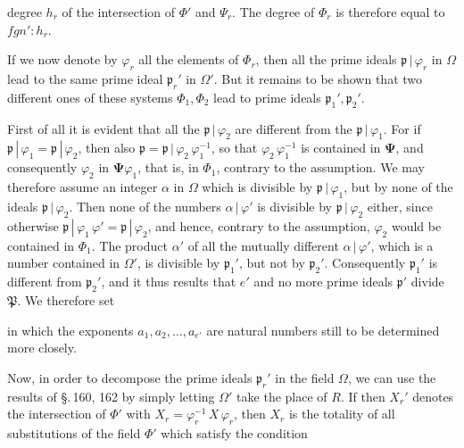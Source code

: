 degree $h_r$ of the intersection of $\Phi'$ and $\Psi_r$. The degree of $\Phi_r$
is therefore equal to $f g n' : h_r$.

If we now denote by $\varphi_r$ all the elements of $\Phi_r$, then all
the prime ideals $\mathfrak{p}\,|\,\varphi_r$ in $\Omega$ lead to the same prime ideal
$\mathfrak{p}_r'$ in $\Omega'$. But it remains to be shown that two different ones
of these systems $\Phi_1, \Phi_2$ lead to  prime ideals $\mathfrak{p}_1', \mathfrak{p}_2'$.

First of all it is evident that all the $\mathfrak{p}\,|\,\varphi_2$ are different from
the $\mathfrak{p}\,|\,\varphi_1$. For if $\mathfrak{p}\,|\,\varphi_1 = \mathfrak{p}\,|\,\varphi_2$, then also
$\mathfrak{p} = \mathfrak{p}\,|\,\varphi_2\,\varphi_1^{-1}$, so that $\varphi_2\,\varphi_1^{-1}$ is contained in $\boldsymbol{\Psi}$, and consequently
$\varphi_2$ in $\boldsymbol{\Psi}\varphi_1$, that is, in $\Phi_1$, contrary to the assumption. We
may therefore assume an integer $\alpha$ in $\Omega$ which is divisible by
$\mathfrak{p}\,|\,\varphi_1$, but by none of the ideals $\mathfrak{p}\,|\,\varphi_2$. Then none of the
numbers $\alpha\,|\,\varphi'$ is divisible by $\mathfrak{p}\,|\,\varphi_2$ either, since otherwise
$\mathfrak{p}\,|\,\varphi_1\,\varphi' = \mathfrak{p}\,|\,\varphi_2$, and hence, contrary to the assumption, $\varphi_2$ would be
contained in $\Phi_1$. The product $\alpha'$ of all the mutually different
$\alpha\,|\,\varphi'$, which is a number contained in $\Omega'$, is divisible by
$\mathfrak{p}_1'$, but not by $\mathfrak{p}_2'$. Consequently $\mathfrak{p}_1'$ is different from $\mathfrak{p}_2'$,
and it thus results that $e'$ and
no more  prime ideals $\mathfrak{p}'$ divide $\mathfrak{P}$.
We therefore set


in which the exponents $a_1, a_2, \ldots, a_{e'}$ are natural numbers still
to be determined more closely.

Now, in order to decompose the prime ideals $\mathfrak{p}_r'$ in the field $\Omega$,
we can use the results of \S.\,160, 162 by simply letting $\Omega'$
take the place of $R$. If then $X_r'$ denotes the intersection
of $\Phi'$ with $X_r = \varphi_r^{-1}\,X\,\varphi_r$, then $X_r$ is the totality of all %
substitutions of the field $\Phi'$ which satisfy the condition


